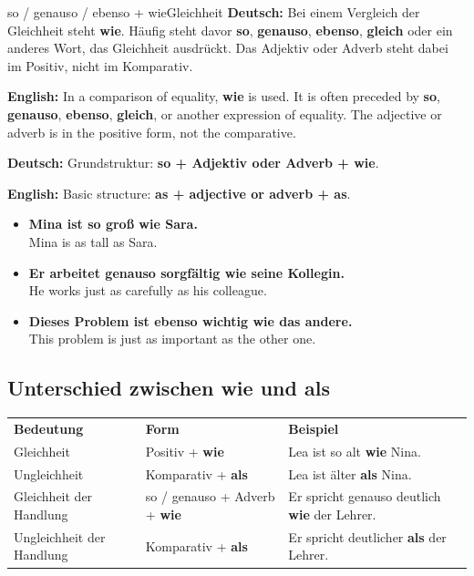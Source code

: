 \documentclass[a4paper,11pt]{article}
\newcommand{\GermanText}[1]{\textbf{Deutsch: }#1\par}
\newcommand{\EnglishText}[1]{{\small\color{SoftGray}\textbf{English: }#1\par}}
\newcommand{\ExampleItem}[2]{\item \textbf{#1}\\{\small\color{SoftGray}#2}}
\newcommand{\TableHead}[1]{\cellcolor{HeaderBlueDark}\color{white}\textbf{#1}}
\begin{document}
\begin{grammarentry}{so / genauso / ebenso + wie}{Gleichheit}
\GermanText{Bei einem Vergleich der Gleichheit steht \textbf{wie}. Häufig steht davor \textbf{so}, \textbf{genauso}, \textbf{ebenso}, \textbf{gleich} oder ein anderes Wort, das Gleichheit ausdrückt. Das Adjektiv oder Adverb steht dabei im Positiv, nicht im Komparativ.}
\EnglishText{In a comparison of equality, \textbf{wie} is used. It is often preceded by \textbf{so}, \textbf{genauso}, \textbf{ebenso}, \textbf{gleich}, or another expression of equality. The adjective or adverb is in the positive form, not the comparative.}

\GermanText{Grundstruktur: \textbf{so + Adjektiv oder Adverb + wie}.}
\EnglishText{Basic structure: \textbf{as + adjective or adverb + as}.}
\end{grammarentry}

\begin{exbox}
\begin{itemize}
\ExampleItem{Mina ist so groß wie Sara.}{Mina is as tall as Sara.}
\ExampleItem{Er arbeitet genauso sorgfältig wie seine Kollegin.}{He works just as carefully as his colleague.}
\ExampleItem{Dieses Problem ist ebenso wichtig wie das andere.}{This problem is just as important as the other one.}
\end{itemize}
\end{exbox}

\subsection{Unterschied zwischen \glqq wie\grqq{} und \glqq als\grqq}

\begin{longtable}{>{\raggedright\arraybackslash}p{}>{\raggedright\arraybackslash}p{}>{\raggedright\arraybackslash}p{}}
\TableHead{Bedeutung} & \TableHead{Form} & \TableHead{Beispiel} \\
Gleichheit & Positiv + \textbf{wie} & Lea ist so alt \textbf{wie} Nina.\\
Ungleichheit & Komparativ + \textbf{als} & Lea ist älter \textbf{als} Nina.\\
Gleichheit der Handlung & so / genauso + Adverb + \textbf{wie} & Er spricht genauso deutlich \textbf{wie} der Lehrer.\\
Ungleichheit der Handlung & Komparativ + \textbf{als} & Er spricht deutlicher \textbf{als} der Lehrer.\\
\end{longtable}
\end{document}
